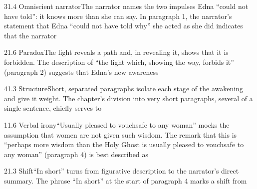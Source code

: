 \documentclass[11pt]{article}
\begin{document}
\begin{q}{3}{1.4 Omniscient narrator}{The narrator names the two impulses Edna ``could not have told'': it knows more than she can say.}
In paragraph 1, the narrator's statement that Edna ``could not have told why'' she acted as she did indicates that the narrator
\end{q}

\begin{q}{2}{1.6 Paradox}{The light reveals a path and, in revealing it, shows that it is forbidden.}
The description of ``the light which, showing the way, forbids it'' (paragraph 2) suggests that Edna's new awareness
\end{q}

\begin{q}{4}{1.3 Structure}{Short, separated paragraphs isolate each stage of the awakening and give it weight.}
The chapter's division into very short paragraphs, several of a single sentence, chiefly serves to
\end{q}

\begin{q}{1}{1.6 Verbal irony}{``Usually pleased to vouchsafe to any woman'' mocks the assumption that women are not given such wisdom.}
The remark that this is ``perhaps more wisdom than the Holy Ghost is usually pleased to vouchsafe to any woman'' (paragraph 4) is best described as
\end{q}

\begin{q}{2}{1.3 Shift}{``In short'' turns from figurative description to the narrator's direct summary.}
The phrase ``In short'' at the start of paragraph 4 marks a shift from
\end{q}
\end{document}
